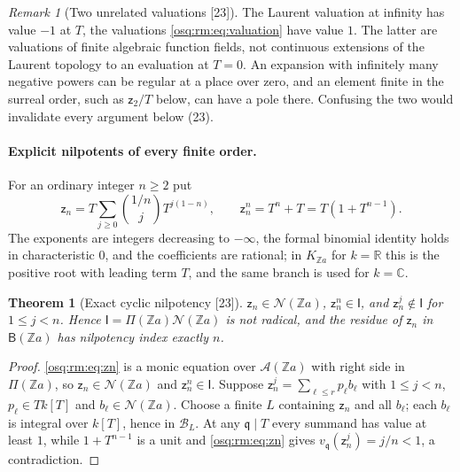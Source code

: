\documentclass[11pt,letterpaper]{article}
\numberwithin{equation}{section}
\newtheorem{theorem}{Theorem}[section]
\theoremstyle{definition}
\theoremstyle{remark}
\newtheorem{remark}[remark]{Remark}
\theoremstyle{plain}
\newcommand{\Z}{\mathbb Z}
\newcommand{\R}{\mathbb R}
\newcommand{\C}{\mathbb C}
\newcommand{\A}{\mathcal A}          %
\newcommand{\NN}{\mathcal N}         %
\newcommand{\src}[1]{\textup{\textsf{[#1]}}}
\begin{document}
\begin{remark}[Two unrelated valuations \src{23}]\label{osq:rm:rem:twoplaces}
The Laurent valuation at infinity has value $-1$ at $T$, the valuations \eqref{osq:rm:eq:valuation} have value $1$. The latter are valuations of finite
algebraic function fields, not continuous extensions of the Laurent topology to an evaluation at $T=0$. An expansion with infinitely many negative
powers can be regular at a place over zero, and an element finite in the surreal order, such as $\mathsf z_2/T$ below, can have a pole there.
Confusing the two would invalidate every argument below (23).
\end{remark}

\paragraph{Explicit nilpotents of every finite order.} For an ordinary integer $n\ge2$ put
\begin{equation}\label{osq:rm:eq:zn}
 \mathsf z_n=T\sum_{j\ge0}\binom{1/n}jT^{j(1-n)},\qquad \mathsf z_n^n=T^n+T=T(1+T^{n-1}).
\end{equation}
The exponents are integers decreasing to $-\infty$, the formal binomial identity holds in characteristic $0$, and the coefficients are rational;
in $K_{\Z a}$ for $k=\R$ this is the positive root with leading term $T$, and the same branch is used for $k=\C$.

\begin{theorem}[Exact cyclic nilpotency \src{23}]\label{osq:rm:thm:explicit}
$\mathsf z_n\in\NN(\Z a)$, $\mathsf z_n^n\in\mathsf I$, and $\mathsf z_n^j\notin\mathsf I$ for $1\le j<n$. Hence $\mathsf I=\Pi(\Z a)\NN(\Z a)$ is not radical,
and the residue of $\mathsf z_n$ in $\mathsf B(\Z a)$ has nilpotency index exactly $n$.
\end{theorem}
\begin{proof}
\eqref{osq:rm:eq:zn} is a monic equation over $\A(\Z a)$ with right side in $\Pi(\Z a)$, so $\mathsf z_n\in\NN(\Z a)$ and $\mathsf z_n^n\in\mathsf I$. Suppose
$\mathsf z_n^j=\sum_{\ell\le r}p_\ell b_\ell$ with $1\le j<n$, $p_\ell\in Tk[T]$ and $b_\ell\in\NN(\Z a)$. Choose a finite $L$ containing $\mathsf z_n$ and all
$b_\ell$; each $b_\ell$ is integral over $k[T]$, hence in $\mathscr B_L$. At any $\mathfrak q\mid T$ every summand has value at least $1$, while
$1+T^{n-1}$ is a unit and \eqref{osq:rm:eq:zn} gives $v_{\mathfrak q}(\mathsf z_n^j)=j/n<1$, a contradiction.
\end{proof}
\end{document}
